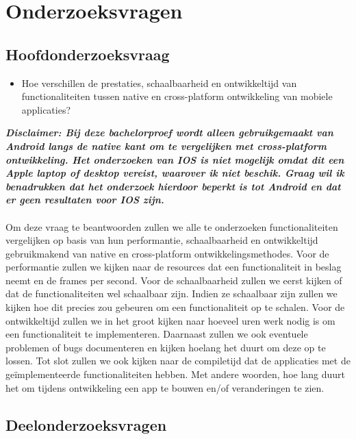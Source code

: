 \section{Onderzoeksvragen}%
\label{sec:onderzoeksvraag}

\subsection{Hoofdonderzoeksvraag}
\begin{itemize}
    \item Hoe verschillen de prestaties, schaalbaarheid en ontwikkeltijd van functionaliteiten tussen native en cross-platform ontwikkeling van mobiele applicaties?
\end{itemize}

\label{disclaimer:ios}
\textbf{\textit{Disclaimer: Bij deze bachelorproef wordt alleen gebruikgemaakt van Android langs de native kant om te vergelijken met cross-platform ontwikkeling. 
Het onderzoeken van IOS is niet mogelijk omdat dit een Apple laptop of desktop vereist, waarover ik niet beschik. 
Graag wil ik benadrukken dat het onderzoek hierdoor beperkt is tot Android en dat er geen resultaten voor IOS zijn.}}
\\\\
Om deze vraag te beantwoorden zullen we alle te onderzoeken functionaliteiten vergelijken op basis van hun performantie, 
schaalbaarheid en ontwikkeltijd gebruikmakend van native en cross-platform ontwikkelingsmethodes. 
Voor de performantie zullen we kijken naar de resources dat een functionaliteit in beslag neemt en de frames per second. 
Voor de schaalbaarheid zullen we eerst kijken of dat de functionaliteiten wel schaalbaar zijn. 
Indien ze schaalbaar zijn zullen we kijken hoe dit precies zou gebeuren om een functionaliteit op te schalen. 
Voor de ontwikkeltijd zullen we in het groot kijken naar hoeveel uren werk nodig is om een functionaliteit te implementeren. 
Daarnaast zullen we ook eventuele problemen of bugs documenteren en kijken hoelang het duurt om deze op te lossen. 
Tot slot zullen we ook kijken naar de compiletijd dat de applicaties met de geïmplementeerde functionaliteiten hebben. 
Met andere woorden, hoe lang duurt het om tijdens ontwikkeling een app te bouwen en/of veranderingen te zien.

\subsection{Deelonderzoeksvragen}

